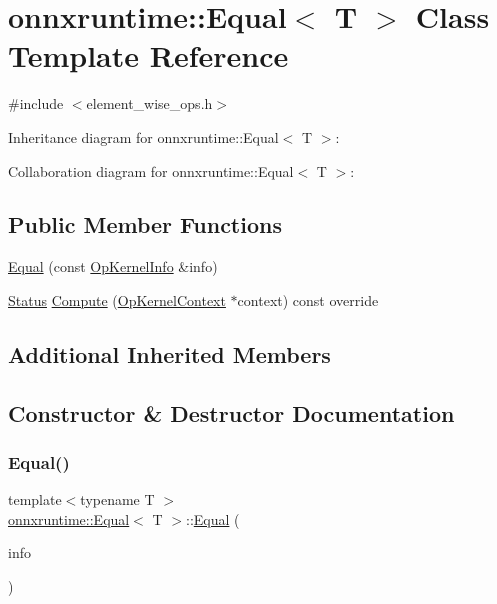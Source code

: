 \hypertarget{classonnxruntime_1_1Equal}{}\section{onnxruntime\+:\+:Equal$<$ T $>$ Class Template Reference}
\label{classonnxruntime_1_1Equal}


{\ttfamily \#include $<$element\+\_\+wise\+\_\+ops.\+h$>$}



Inheritance diagram for onnxruntime\+:\+:Equal$<$ T $>$\+:


Collaboration diagram for onnxruntime\+:\+:Equal$<$ T $>$\+:
\subsection*{Public Member Functions}
\begin{DoxyCompactItemize}
\item 
\mbox{\hyperlink{classonnxruntime_1_1Equal_aef4163c1d7a1218a170c630cdec315d4}{Equal}} (const \mbox{\hyperlink{classonnxruntime_1_1OpKernelInfo}{Op\+Kernel\+Info}} \&info)
\item 
\mbox{\hyperlink{classonnxruntime_1_1common_1_1Status}{Status}} \mbox{\hyperlink{classonnxruntime_1_1Equal_ad3321c6389ed2a0928e95d75774ef5d3}{Compute}} (\mbox{\hyperlink{classonnxruntime_1_1OpKernelContext}{Op\+Kernel\+Context}} $\ast$context) const override
\end{DoxyCompactItemize}
\subsection*{Additional Inherited Members}


\subsection{Constructor \& Destructor Documentation}
\mbox{\label{classonnxruntime_1_1Equal_aef4163c1d7a1218a170c630cdec315d4}} 
\subsubsection{\texorpdfstring{Equal()}{Equal()}}
{\footnotesize\ttfamily template$<$typename T $>$ \\
\mbox{\hyperlink{classonnxruntime_1_1Equal}{onnxruntime\+::\+Equal}}$<$ T $>$\+::\mbox{\hyperlink{classonnxruntime_1_1Equal}{Equal}} (\begin{DoxyParamCaption}\item[{const \mbox{\hyperlink{classonnxruntime_1_1OpKernelInfo}{Op\+Kernel\+Info}} \&}]{info }\end{DoxyParamCaption})\hspace{0.3cm}{\ttfamily [inline]}}



